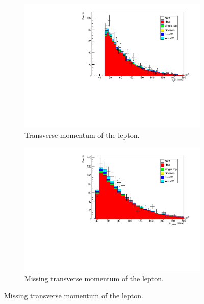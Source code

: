 \begin{figure}[H]%
  \begin{subfigure}{0.48\textwidth}%
    \centering%
    \includegraphics[width=\textwidth]{plots/comparism/lep_pt.pdf}%
    \caption{Transverse momentum of the lepton.}%
    \label{fig:6a}%
  \end{subfigure}%
  \hfill
  \begin{subfigure}{0.48\textwidth}%
    \centering%
    \includegraphics[width=\textwidth]{plots/comparism/met_et.pdf}%
    \caption{Missing transverse momentum of the lepton.}%
    \label{fig:6b}%
  \end{subfigure}%


\end{figure}

